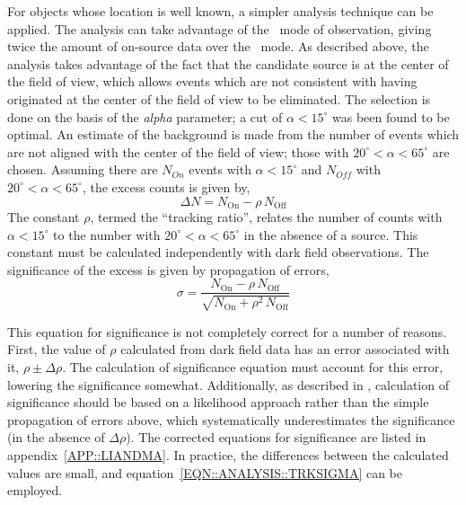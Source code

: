 For objects whose location is well known, a simpler analysis technique
can be applied. The analysis can take advantage of the \Trk\ mode of
observation, giving twice the amount of on-source data over the \Pairs\
mode. As described above, the analysis takes advantage of the fact
that the candidate source is at the center of the field of view, which
allows events which are not consistent with having originated at the
center of the field of view to be eliminated. The selection is done on
the basis of the \textit{alpha} parameter; a cut of $\alpha<15^\circ$
was been found to be optimal. An estimate of the background is made
from the number of events which are not aligned with the center of the
field of view; those with $20^\circ<\alpha<65^\circ$ are
chosen. Assuming there are $N_{On}$ events with $\alpha<15^\circ$ and
$N_{Off}$ with $20^\circ<\alpha<65^\circ$, the excess counts is given
by,
\begin{equation}\label{EQN::ANALYSIS::TRKEXCESS}
\Delta N = N_\mathrm{On}-\rho\,N_\mathrm{Off}
\end{equation}
The constant $\rho$, termed the ``tracking ratio'', relates the number
of counts with $\alpha<15^\circ$ to the number with
$20^\circ<\alpha<65^\circ$ in the absence of a source. This constant
must be calculated independently with dark field observations. The
significance of the excess is given by propagation of errors,
\begin{equation}\label{EQN::ANALYSIS::TRKSIGMA}
\sigma = \frac{N_\mathrm{On}-\rho\,N_\mathrm{Off}}
{\sqrt{N_\mathrm{On}+\rho^2\,N_\mathrm{Off}}}
\end{equation}

This equation for significance is not completely correct for a number
of reasons. First, the value of $\rho$ calculated from dark field data
has an error associated with it, $\rho\pm\Delta\rho$. The calculation
of significance equation must account for this error, lowering the
significance somewhat. Additionally, as described in
\citet{REF::LIANDMA::1983APJ}, calculation of significance should be
based on a likelihood approach rather than the simple propagation of
errors above, which systematically underestimates the significance (in
the absence of $\Delta\rho$). The corrected equations for significance
are listed in appendix~\ref{APP::LIANDMA}. In practice, the
differences between the calculated values are small, and
equation~\ref{EQN::ANALYSIS::TRKSIGMA} can be employed.




